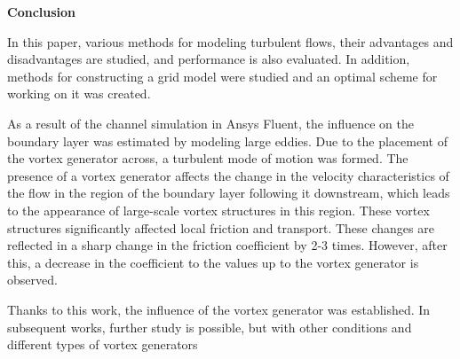 \begin{center}
	\Large\textbf{Conclusion}
\end{center}

In this paper, various methods for modeling turbulent flows, their advantages and disadvantages are studied, and performance is also evaluated. In addition, methods for constructing a grid model were studied and an optimal scheme for working on it was created.

As a result of the channel simulation in Ansys Fluent, the influence on the boundary layer was estimated by modeling large eddies. Due to the placement of the vortex generator across, a turbulent mode of motion was formed. The presence of a vortex generator affects the change in the velocity characteristics of the flow in the region of the boundary layer following it downstream, which leads to the appearance of large-scale vortex structures in this region. These vortex structures significantly affected local friction and transport. These changes are reflected in a sharp change in the friction coefficient by 2-3 times. However, after this, a decrease in the coefficient to the values up to the vortex generator is observed.

Thanks to this work, the influence of the vortex generator was established. In subsequent works, further study is possible, but with other conditions and different types of vortex generators